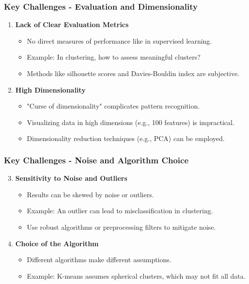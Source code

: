 \documentclass[aspectratio=169]{beamer}
\begin{document}
\begin{frame}[fragile]
    \frametitle{Key Challenges - Evaluation and Dimensionality}
    \begin{enumerate}
        \item \textbf{Lack of Clear Evaluation Metrics}
        \begin{itemize}
            \item No direct measures of performance like in supervised learning.
            \item Example: In clustering, how to assess meaningful clusters?
            \item Methods like silhouette scores and Davies-Bouldin index are subjective.
        \end{itemize}

        \item \textbf{High Dimensionality}
        \begin{itemize}
            \item "Curse of dimensionality" complicates pattern recognition.
            \item Visualizing data in high dimensions (e.g., 100 features) is impractical.
            \item Dimensionality reduction techniques (e.g., PCA) can be employed.
        \end{itemize}
    \end{enumerate}
\end{frame}

\begin{frame}[fragile]
    \frametitle{Key Challenges - Noise and Algorithm Choice}
    \begin{enumerate}
        \setcounter{enumi}{2}
        \item \textbf{Sensitivity to Noise and Outliers}
        \begin{itemize}
            \item Results can be skewed by noise or outliers.
            \item Example: An outlier can lead to misclassification in clustering.
            \item Use robust algorithms or preprocessing filters to mitigate noise.
        \end{itemize}

        \item \textbf{Choice of the Algorithm}
        \begin{itemize}
            \item Different algorithms make different assumptions.
            \item Example: K-means assumes spherical clusters, which may not fit all data.
        \end{itemize}
    \end{enumerate}
\end{frame}
\end{document}
